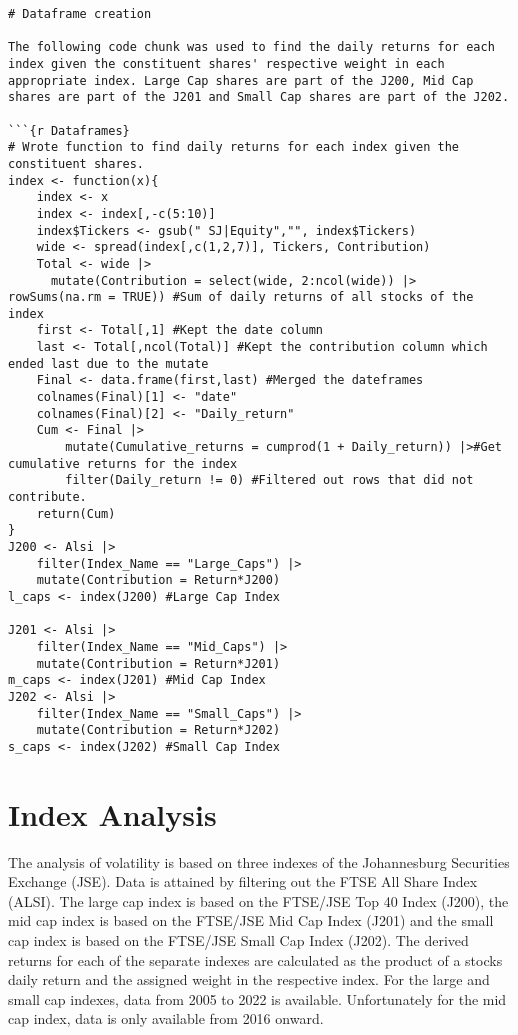 \documentclass[
]{article}
\begin{document}
\begin{verbatim}
# Dataframe creation 

The following code chunk was used to find the daily returns for each index given the constituent shares' respective weight in each appropriate index. Large Cap shares are part of the J200, Mid Cap shares are part of the J201 and Small Cap shares are part of the J202. 

```{r Dataframes}
# Wrote function to find daily returns for each index given the constituent shares. 
index <- function(x){
    index <- x
    index <- index[,-c(5:10)]
    index$Tickers <- gsub(" SJ|Equity","", index$Tickers)
    wide <- spread(index[,c(1,2,7)], Tickers, Contribution)
    Total <- wide |> 
      mutate(Contribution = select(wide, 2:ncol(wide)) |> rowSums(na.rm = TRUE)) #Sum of daily returns of all stocks of the index
    first <- Total[,1] #Kept the date column
    last <- Total[,ncol(Total)] #Kept the contribution column which ended last due to the mutate
    Final <- data.frame(first,last) #Merged the dateframes
    colnames(Final)[1] <- "date"
    colnames(Final)[2] <- "Daily_return"
    Cum <- Final |> 
        mutate(Cumulative_returns = cumprod(1 + Daily_return)) |>#Get cumulative returns for the index
        filter(Daily_return != 0) #Filtered out rows that did not contribute. 
    return(Cum)
}
J200 <- Alsi |> 
    filter(Index_Name == "Large_Caps") |> 
    mutate(Contribution = Return*J200)
l_caps <- index(J200) #Large Cap Index

J201 <- Alsi |> 
    filter(Index_Name == "Mid_Caps") |> 
    mutate(Contribution = Return*J201)
m_caps <- index(J201) #Mid Cap Index
J202 <- Alsi |> 
    filter(Index_Name == "Small_Caps") |> 
    mutate(Contribution = Return*J202)
s_caps <- index(J202) #Small Cap Index
\end{verbatim}

\hypertarget{index-analysis}{%
\section{Index Analysis}\label{index-analysis}}

The analysis of volatility is based on three indexes of the Johannesburg
Securities Exchange (JSE). Data is attained by filtering out the FTSE
All Share Index (ALSI). The large cap index is based on the FTSE/JSE Top
40 Index (J200), the mid cap index is based on the FTSE/JSE Mid Cap
Index (J201) and the small cap index is based on the FTSE/JSE Small Cap
Index (J202). The derived returns for each of the separate indexes are
calculated as the product of a stocks daily return and the assigned
weight in the respective index. For the large and small cap indexes,
data from 2005 to 2022 is available. Unfortunately for the mid cap
index, data is only available from 2016 onward.
\end{document}
